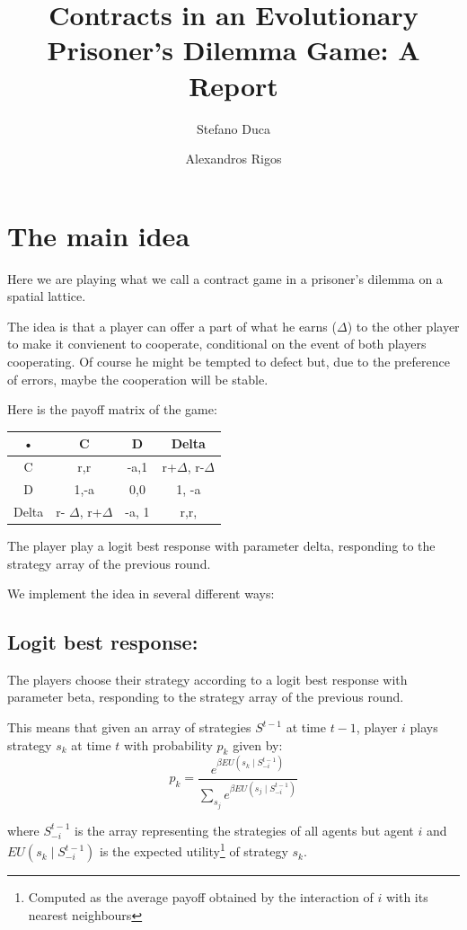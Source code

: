 \documentclass{article}
\author{Stefano Duca \and Alexandros Rigos}
\title{Contracts in an Evolutionary Prisoner's Dilemma Game: A Report}
\begin{document}
\maketitle

\section{The main idea}
Here we are playing what we call a contract game in a prisoner's dilemma on a spatial lattice.

The idea is that a player can offer a part of what he earns ($\Delta$) to the other player to make it convienent to cooperate, conditional on the event of both players cooperating. Of course he might be tempted to defect but, due to the preference of errors, maybe the cooperation will be stable.

Here is the payoff matrix of the game:
\begin{center}
\begin{tabular}{|c|c|c|c|}
\hline 
• & C & D & Delta \\ 
\hline 
C & r,r & -a,1 & r+$\Delta$, r-$\Delta$ \\ 
\hline 
D & 1,-a & 0,0 & 1, -a \\ 
\hline 
Delta & r- $\Delta$, r+$\Delta$ & -a, 1 & r,r, \\ 
\hline 
\end{tabular} 
\end{center}

The player play a logit best response with parameter delta, responding to the strategy array of the previous round.

We implement the idea in several different ways:

\subsection{Logit best response:}
The players choose their strategy according to a logit best response with parameter beta, responding to the strategy array of the previous round.

This means that given an array of strategies $S^{t-1}$ at time $t-1$, player $i$ plays strategy $s_k$ at time $t$ with probability $p_k$ given by:
$$
p_{k}=\frac{e^{\beta EU\left(s_{k}\mid S_{-i}^{t-1}\right)}}{\sum_{s_{j}}e^{\beta EU\left(s_{j}\mid S_{-i}^{t-1}\right)}}
$$

where $ S_{-i}^{t-1}$ is the array representing the strategies of all agents but agent $i$
and $EU\left(s_{k}\mid S_{-i}^{t-1}\right)$ is the expected utility\footnote{Computed as the average payoff obtained by the interaction of $i$ with its nearest neighbours} of strategy $s_k$.
\end{document}
